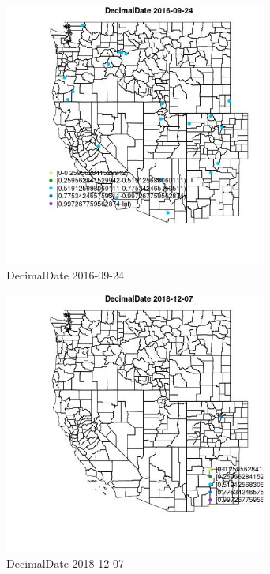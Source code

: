 \begin{figure} 
\centering  
\includegraphics[width=0.77\textwidth]{Code_Outputs/Report_ML_input_PM25_Step4_part_e_de_duplicated_aves_MapObsDecimalDate2016-09-24.jpg} 
\caption{\label{fig:Report_ML_input_PM25_Step4_part_e_de_duplicated_avesMapObsDecimalDate2016-09-24}DecimalDate 2016-09-24} 
\end{figure} 
 

\begin{figure} 
\centering  
\includegraphics[width=0.77\textwidth]{Code_Outputs/Report_ML_input_PM25_Step4_part_e_de_duplicated_aves_MapObsDecimalDate2018-12-07.jpg} 
\caption{\label{fig:Report_ML_input_PM25_Step4_part_e_de_duplicated_avesMapObsDecimalDate2018-12-07}DecimalDate 2018-12-07} 
\end{figure} 
 

